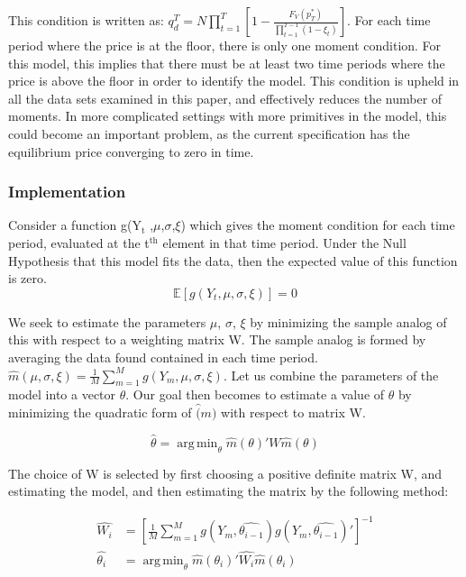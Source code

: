 \documentclass[12pt, letterpaper]{paper}
\DeclareMathOperator*{\argmin}{arg\,min}
\begin{document}
This condition is written as: $q_d^T = N \prod_{t=1}^T \left [ 1 - \frac{ F_V (
p_T^* ) }{ \prod_{t=1}^{T-1} ( 1 - \xi_t ) } \right ]$. For each time period where
the price is at the floor, there is only one moment condition. For
this model, this implies that there must be at least two time periods
where the price is above the floor in order to identify the
model. This condition is upheld in all the data sets examined in this
paper, and effectively reduces the number of moments. In more
complicated settings with more primitives in the model, this could
become an important problem, as the current specification has the
equilibrium price converging to zero in time.

\subsubsection{Implementation}
\label{sec-2-4-2}
Consider a function g(Y$_{\text{t}}$ ,$\mu$,$\sigma$,$\xi$) which gives the moment condition for
each time period, evaluated at the t$^{\text{th}}$ element in that time
period. Under the Null Hypothesis that this model fits the data, then
the expected value of this function is zero.
\begin{equation*}
\mathbb{E}[ g( Y_t, \mu, \sigma, \xi ) ] = 0
\end{equation*}

We seek to estimate the parameters $\mu$, $\sigma$, $\xi$ by minimizing the sample
analog of this with respect to a weighting matrix W. The sample analog
is formed by averaging the data found contained in each time period.
$\hat{m} ( \mu, \sigma, \xi ) = \frac{ 1 }{ M } \sum_{m=1}^M g( Y_m, \mu, \sigma, \xi )$. Let us
combine the parameters of the model into a vector $\theta$. Our goal then
becomes to estimate a value of $\hat{\theta}$ by minimizing the quadratic
form of $\hat(m)$ with respect to matrix W.

\begin{equation*}
\hat{\theta} = \argmin_{\theta} \hat{m}( \theta )' W \hat{m}( \theta )
\end{equation*}

The choice of W is selected by first choosing a positive definite
matrix W, and estimating the model, and then estimating the matrix by
the following method:

\begin{align*}
\hat{W_i} &= \left [ \frac{1}{M} \sum_{m=1}^M g(Y_m, \hat{\theta_{i-1}} ) g( Y_m, \hat{\theta_{i-1}} )' \right ]^{-1} \\
\hat{\theta_i} &= \argmin_{\theta} \hat{m}( \theta_i )' \hat{W_i} \hat{m}( \theta_i ) \\
\end{align*}
\end{document}
